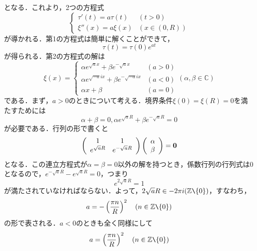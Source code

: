 \documentclass[a4j]{jsbook}
\numberwithin{theorem}{chapter}  %
\begin{document}
となる．これより，2つの方程式
\begin{equation*}
    \begin{cases}
    \tau'(t)=a\tau(t) & (t>0) \\
    \xi''(x)=a\xi(x) & (x\in(0, R))
    \end{cases}
\end{equation*}
が導かれる．第1の方程式は簡単に解くことができて，
\begin{equation*}
    \tau(t)=\tau(0)e^{at}
\end{equation*}
が得られる．第2の方程式の解は
\begin{equation*}
    \xi(x)=
    \begin{cases}
    \alpha e^{\sqrt{a}x}+\beta e^{-\sqrt{a}x} & (a>0) \\
    \alpha e^{\sqrt{-a}ix}+\beta e^{-\sqrt{-a}ix} & (a<0) \\
    \alpha x+\beta & (a=0)
    \end{cases}
    (\alpha, \beta\in\mathbb{C})
\end{equation*}
である．まず，\(a>0\)のときについて考える．境界条件\(\xi(0)=\xi(R)=0\)を満たすためには
\begin{equation*}
    \alpha+\beta=0, \alpha e^{\sqrt{a}R}+\beta e^{-\sqrt{a}R}=0
\end{equation*}
が必要である．行列の形で書くと
\begin{equation*}
    \left(
    \begin{array}{cc}
        1 & 1 \\
        e^{\sqrt{a}R} & e^{-\sqrt{a}R}
    \end{array}
    \right)
    \left(
    \begin{array}{c}
        \alpha \\
        \beta
    \end{array}
    \right)
    =\bf{0}
\end{equation*}
となる．この連立方程式が\(\alpha=\beta=0\)以外の解を持つとき，係数行列の行列式は0となるので，\(e^{-\sqrt{a}R}-e^{\sqrt{a}R}=0\)，つまり
\begin{equation*}
    e^{2\sqrt{a}R}=1
\end{equation*}
が満たされていなければならない．よって，\(2\sqrt{a}R\in -2\pi i(\mathbb{Z}\verb|\|\{0\})\)，すなわち，
\begin{equation*}
    a=-\left(\frac{\pi n}{R}\right)^2\quad (n\in\mathbb{Z}\verb|\|\{0\})
\end{equation*}
の形で表される．\(a<0\)のときも全く同様にして
\begin{equation*}
    a=\left(\frac{\pi n}{R}\right)^2\quad (n\in\mathbb{Z}\verb|\|\{0\})
\end{equation*}
\end{document}
